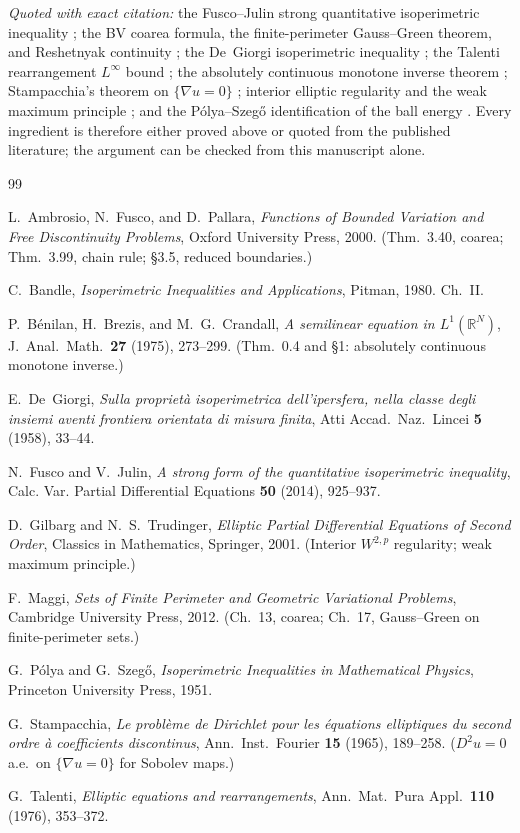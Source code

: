 \documentclass[11pt]{amsart}
\theoremstyle{definition}
\newcommand{\R}{\mathbb R}
\begin{document}
\emph{Quoted with exact citation:} the Fusco--Julin strong quantitative
isoperimetric inequality \cite{FJ2014}; the BV coarea formula, the
finite-perimeter Gauss--Green theorem, and Reshetnyak continuity
\cite{AFP2000,Maggi2012}; the De~Giorgi isoperimetric inequality
\cite{DeGiorgi1958}; the Talenti rearrangement \(L^\infty\) bound
\cite{Talenti1976}; the absolutely continuous monotone inverse theorem
\cite{BBC1975}; Stampacchia's theorem on \(\{\nabla u=0\}\)
\cite{Stampacchia1965}; interior elliptic regularity and the weak maximum
principle \cite{GilbargTrudinger2001}; and the P\'olya--Szeg\H{o}
identification of the ball energy \cite{PolyaSzego1951,Bandle1980}.  Every
ingredient is therefore either proved above or quoted from the published
literature; the argument can be checked from this manuscript alone.

\begin{thebibliography}{99}

L.~Ambrosio, N.~Fusco, and D.~Pallara,
\emph{Functions of Bounded Variation and Free Discontinuity Problems},
Oxford University Press, 2000.
(Thm.~3.40, coarea; Thm.~3.99, chain rule; \S3.5, reduced boundaries.)

C.~Bandle,
\emph{Isoperimetric Inequalities and Applications},
Pitman, 1980. Ch.~II.

P.~B\'enilan, H.~Brezis, and M.~G.~Crandall,
\emph{A semilinear equation in \(L^1(\R^N)\)},
J.~Anal.\ Math.\ \textbf{27} (1975), 273--299.
(Thm.~0.4 and \S1: absolutely continuous monotone inverse.)

E.~De~Giorgi,
\emph{Sulla propriet\`a isoperimetrica dell'ipersfera, nella classe degli
insiemi aventi frontiera orientata di misura finita},
Atti Accad.\ Naz.\ Lincei \textbf{5} (1958), 33--44.

N.~Fusco and V.~Julin,
\emph{A strong form of the quantitative isoperimetric inequality},
Calc. Var. Partial Differential Equations \textbf{50} (2014), 925--937.

D.~Gilbarg and N.~S.~Trudinger,
\emph{Elliptic Partial Differential Equations of Second Order},
Classics in Mathematics, Springer, 2001.
(Interior \(W^{2,p}\) regularity; weak maximum principle.)

F.~Maggi,
\emph{Sets of Finite Perimeter and Geometric Variational Problems},
Cambridge University Press, 2012.
(Ch.~13, coarea; Ch.~17, Gauss--Green on finite-perimeter sets.)

G.~P\'olya and G.~Szeg\H{o},
\emph{Isoperimetric Inequalities in Mathematical Physics},
Princeton University Press, 1951.

G.~Stampacchia,
\emph{Le probl\`eme de Dirichlet pour les \'equations elliptiques du second
ordre \`a coefficients discontinus},
Ann.\ Inst.\ Fourier \textbf{15} (1965), 189--258.
(\(D^2u=0\) a.e.\ on \(\{\nabla u=0\}\) for Sobolev maps.)

G.~Talenti,
\emph{Elliptic equations and rearrangements},
Ann.\ Mat.\ Pura Appl.\ \textbf{110} (1976), 353--372.

\end{thebibliography}
\end{document}
